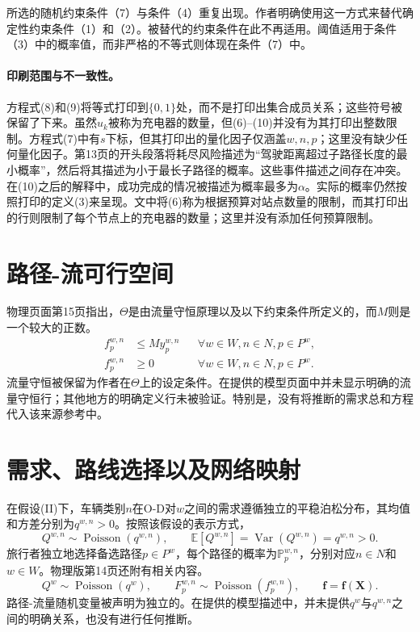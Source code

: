\documentclass{article}
\begin{document}
所选的随机约束条件（7）与条件（4）重复出现。作者明确使用这一方式来替代确定性约束条件（1）和（2）。被替代的约束条件在此不再适用。阈值适用于条件（3）中的概率值，而非严格的不等式则体现在条件（7）中。

\paragraph{印刷范围与不一致性。}
方程式(8)和(9)将等式打印到$\{0,1\}$处，而不是打印出集合成员关系；这些符号被保留了下来。虽然$u_k$被称为充电器的数量，但(6)--(10)并没有为其打印出整数限制。方程式(7)中有$s$下标，但其打印出的量化因子仅涵盖$w,n,p$；这里没有缺少任何量化因子。第13页的开头段落将耗尽风险描述为“驾驶距离超过子路径长度的最小概率”，然后将其描述为小于最长子路径的概率。这些事件描述之间存在冲突。在(10)之后的解释中，成功完成的情况被描述为概率最多为$\alpha$。实际的概率仍然按照打印的定义(3)来呈现。文中将(6)称为根据预算对站点数量的限制，而其打印出的行则限制了每个节点上的充电器的数量；这里并没有添加任何预算限制。

\section*{路径-流可行空间}
物理页面第15页指出，$\Theta$是由流量守恒原理以及以下约束条件所定义的，而$M$则是一个较大的正数。
\begin{align}
f_p^{w,n}&\leq My_p^{w,n}
&&\forall w\in W,n\in N,p\in P^w,\tag{21}\\
f_p^{w,n}&\geq0
&&\forall w\in W,n\in N,p\in P^w.\tag{22}
\end{align}
流量守恒被保留为作者在$\Theta$上的设定条件。在提供的模型页面中并未显示明确的流量守恒行；其他地方的明确定义行未被验证。特别是，没有将推断的需求总和方程代入该来源参考中。

\section*{需求、路线选择以及网络映射}
在假设(II)下，车辆类别$n$在O-D对$w$之间的需求遵循独立的平稳泊松分布，其均值和方差分别为$q^{w,n}>0$。按照该假设的表示方式，
\[
Q^{w,n}\sim\operatorname{Poisson}(q^{w,n}),\qquad
\mathbb E[Q^{w,n}]=\operatorname{Var}(Q^{w,n})=q^{w,n}>0.
\]
旅行者独立地选择备选路径$p\in P^w$，每个路径的概率为$\mathbb P_p^{w,n}$，分别对应$n\in N$和$w\in W$。物理版第14页还附有相关内容。
\[
Q^w\sim\operatorname{Poisson}(q^w),\qquad
F_p^{w,n}\sim\operatorname{Poisson}(f_p^{w,n}),\qquad
\mathbf f=\mathbf f(\mathbf X).
\]
路径-流量随机变量被声明为独立的。在提供的模型描述中，并未提供$q^w$与$q^{w,n}$之间的明确关系，也没有进行任何推断。
\end{document}
